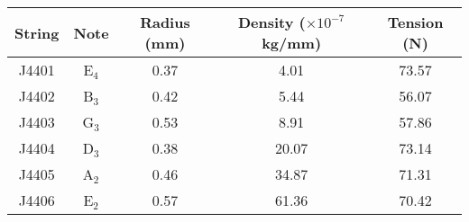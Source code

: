 \begin{tabular}{ccccc}
\toprule
String &     Note &  Radius (mm) &  Density ($\times 10^{-7}$ kg/mm) &  Tension (N) \\
\midrule
 J4401 &  E$_{4}$ &         0.37 &                              4.01 &        73.57 \\
 J4402 &  B$_{3}$ &         0.42 &                              5.44 &        56.07 \\
 J4403 &  G$_{3}$ &         0.53 &                              8.91 &        57.86 \\
 J4404 &  D$_{3}$ &         0.38 &                             20.07 &        73.14 \\
 J4405 &  A$_{2}$ &         0.46 &                             34.87 &        71.31 \\
 J4406 &  E$_{2}$ &         0.57 &                             61.36 &        70.42 \\
\bottomrule
\end{tabular}

